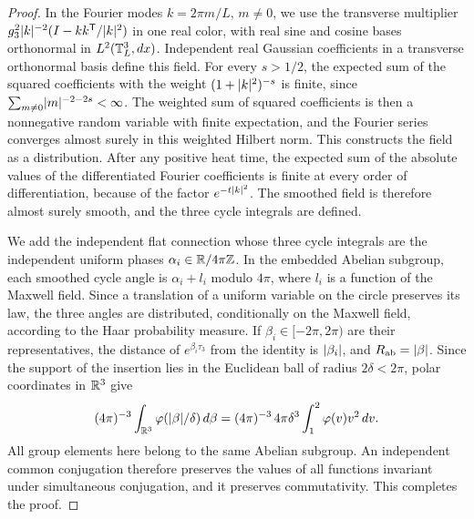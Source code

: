 \begin{proof}
In the Fourier modes $k=2\pi m/L$, $m\ne0$, we use the transverse multiplier $g_3^2\lvert k\rvert^{-2}(I-kk^{\mathsf T}/\lvert k\rvert^2)$ in one real color, with real sine and cosine bases orthonormal in $L^2(\mathbb T_L^3,dx)$. Independent real Gaussian coefficients in a transverse orthonormal basis define this field. For every $s>1/2$, the expected sum of the squared coefficients with the weight $(1+\lvert k\rvert^2)^{-s}$ is finite, since $\sum_{m\ne0}\lvert m\rvert^{-2-2s}<\infty$. The weighted sum of squared coefficients is then a nonnegative random variable with finite expectation, and the Fourier series converges almost surely in this weighted Hilbert norm. This constructs the field as a distribution. After any positive heat time, the expected sum of the absolute values of the differentiated Fourier coefficients is finite at every order of differentiation, because of the factor $e^{-t\lvert k\rvert^2}$. The smoothed field is therefore almost surely smooth, and the three cycle integrals are defined.

We add the independent flat connection whose three cycle integrals are the independent uniform phases $\alpha_i\in\mathbb R/4\pi\mathbb Z$. In the embedded Abelian subgroup, each smoothed cycle angle is $\alpha_i+l_i$ modulo $4\pi$, where $l_i$ is a function of the Maxwell field. Since a translation of a uniform variable on the circle preserves its law, the three angles are distributed, conditionally on the Maxwell field, according to the Haar probability measure. If $\beta_i\in[-2\pi,2\pi)$ are their representatives, the distance of $e^{\beta_i\tau_3}$ from the identity is $\lvert \beta_i\rvert$, and $R_{\mathrm{ab}}=\lvert \beta\rvert$. Since the support of the insertion lies in the Euclidean ball of radius $2\delta<2\pi$, polar coordinates in $\mathbb R^3$ give
\[
 (4\pi)^{-3}\int_{\mathbb R^3}\varphi(\lvert \beta\rvert/\delta)\,d\beta=(4\pi)^{-3}\,4\pi\delta^3\int_1^2\varphi(v)v^2\,dv.
\]
All group elements here belong to the same Abelian subgroup. An independent common conjugation therefore preserves the values of all functions invariant under simultaneous conjugation, and it preserves commutativity. This completes the proof.
\end{proof}

